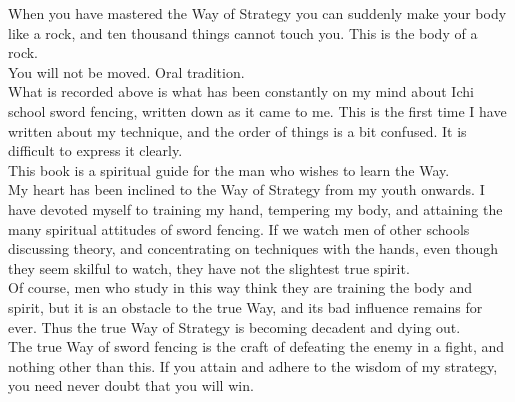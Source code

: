 When you have mastered the Way of Strategy you can suddenly make your body like a rock, and ten thousand things cannot touch you. This is the body of a rock.\\

You will not be moved. Oral tradition.\\

What is recorded above is what has been constantly on my mind about Ichi school sword fencing, written down as it came to me. This is the first time I have written about my technique, and the order of things is a bit confused. It is difficult to express it clearly.\\

This book is a spiritual guide for the man who wishes to learn the Way.\\

My heart has been inclined to the Way of Strategy from my youth onwards. I have devoted myself to training my hand, tempering my body, and attaining the many spiritual attitudes of sword fencing. If we watch men of other schools discussing theory, and concentrating on techniques with the hands, even though they seem skilful to watch, they have not the slightest true spirit.\\

Of course, men who study in this way think they are training the body and spirit, but it is an obstacle to the true Way, and its bad influence remains for ever. Thus the true Way of Strategy is becoming decadent and dying out.\\

The true Way of sword fencing is the craft of defeating the enemy in a fight, and nothing other than this. If you attain and adhere to the wisdom of my strategy, you need never doubt that you will win. 
